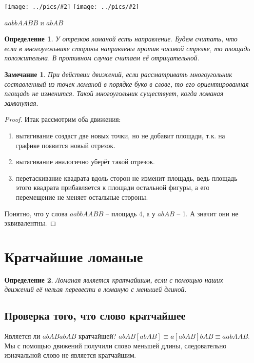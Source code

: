 \documentclass[12pt,a4paper, flushleft]{article}
\newtheorem{Def}{Определение}[section]
\newtheorem{Zm}{Замечание}[section]
\newcommand{\gr}[2]{\texttt{[image: ../pics/\#2]}}
\begin{document}
\begin{multicols}{2}
\gr{0.25}{aabbAABB} \gr{0.25}{abAB}\columnbreak

$aabbAABB$ и $abAB$

\begin{Def}
	У отрезков ломаной есть направление. Будем считать, что если в многоугольнике стороны направлены против часовой стрелке, то площадь положительна. В противном случае считаем её отрицательной.
\end{Def}
\begin{Zm}
При действии движений, если рассматривать многоугольник составленный из точек ломаной в порядке букв в слове, то его ориентированная площадь не изменится. Такой многоугольник существует, когда ломаная замкнутая.
\end{Zm}
\end{multicols}
\begin{proof}
Итак рассмотрим оба движения:
\begin{enumerate}
	\item вытягивание создаст две новых точки, но не добавит площади, т.к. на графике появится новый отрезок.
	\item вытягивание аналогично уберёт такой отрезок.
	\item перетаскивание квадрата вдоль сторон не изменит площадь, ведь площадь этого квадрата прибавляется к площади остальной фигуры, а его перемещение не меняет остальные стороны. 
\end{enumerate}

Понятно, что у слова $aabbAABB$ -- площадь 4, а у $abAB$ -- 1. А значит они не эквивалентны.
\end{proof}


\section{Кратчайшие ломаные}
\begin{Def}
	Ломаная является кратчайшим, если с помощью наших движений её нельзя перевести в ломаную с меньшей длиной.
\end{Def}

\subsection{Проверка того, что слово кратчайшее}
Является ли $abABabAB$ кратчайшей? $abAB[abAB] \equiv a[abAB]bAB\equiv aabAAB$. Мы с помощью движений получили слово меньшей длины, следовательно изначальной слово не является кратчайшим.
\end{document}

